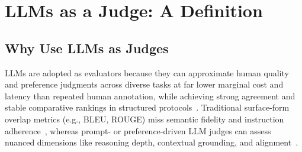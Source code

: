 \section{LLMs as a Judge: A Definition}

\subsection{Why Use LLMs as Judges}
LLMs are adopted as evaluators because they can approximate human quality and preference judgments across diverse tasks at far lower marginal cost and latency than repeated human annotation, while achieving strong agreement and stable comparative rankings in structured protocols~\cite{li2024_llmsasjudges, zheng2023judgelm, bavaresco2024judgebench}. Traditional surface-form overlap metrics (e.g., BLEU, ROUGE) miss semantic fidelity and instruction adherence~\cite{papineni2002bleu, lin2004rouge}, whereas prompt- or preference-driven LLM judges can assess nuanced dimensions like reasoning depth, contextual grounding, and alignment~\cite{fu2023gptscore, stiennon2020learning, ouyang2022training}.

